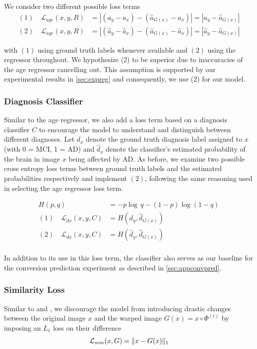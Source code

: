 We consider two different possible loss terms 
\begin{equation}
	\begin{split}
		(1) \quad \mathcal{L}_{age}(x, y, R) & = 
		| (a_y - a_x) - (\hat a_{G(x)} - a_x) | =
		| a_y - \hat a_{G(x)} | \\[8pt]
		(2) \quad \mathcal{L}_{age}(x, y, R) & =
		| (\hat a_y - \hat a_x) - (\hat a_{G(x)} - \hat a_x) | = 
		| \hat a_y - \hat a_{G(x)} |
	\end{split}
\end{equation}

with $(1)$ using ground truth labels whenever available and $(2)$ using the regressor throughout. We hypothesize (2) to be superior due to inaccuracies of the age regressor cancelling out. This assumption is supported by our experimental results in \autoref{sec:expreg} and consequently, we use (2) for our model.

\subsubsection*{Diagnosis Classifier}
Similar to the age regressor, we also add a loss term based on a diagnosis classifier $C$ to encourage the model to understand and distinguish between different diagnoses. Let $d_x$ denote the ground truth diagnosis label assigned to $x$ (with 0 = MCI, 1 = AD) and $\hat d_x$ denote the classifier's estimated probability of the brain in image $x$ being affected by AD. As before, we examine two possible cross entropy loss terms between ground truth labels and the estimated probabilities respectively and implement $(2)$, following the same reasoning used in selecting the age regressor loss term.

\begin{equation}
	\begin{split}
		H(p, q) & = -p \log\, q - (1 - p)\log(1 - q) \\[8pt]
		(1) \quad \mathcal{L}_{dx}(x, y, C) & = 
		H(d_y, \hat d_{G(x)}) \\[8pt]
		(2) \quad \mathcal{L}_{dx}(x, y, C) & =
		H(\hat d_y, \hat d_{G(x)}) \\[8pt]
	\end{split}
\end{equation}

In addition to its use in this loss term, the classifier also serves as our baseline for the conversion prediction experiment as described in \autoref{sec:appconvpred}.

\subsubsection*{Similarity Loss}
Similar to \cite{baumgartner2018visual} and \cite{wegmayr2019generative}, we discourage the model from introducing drastic changes between the original image $x$ and the warped image $ G(x) = x \circ \Phi^{(t)} $ by imposing an $L_1$ loss on their difference
\begin{equation}
	\mathcal{L}_{sim}( x, G ) = \lVert x - G(x) \rVert_1
\end{equation}

